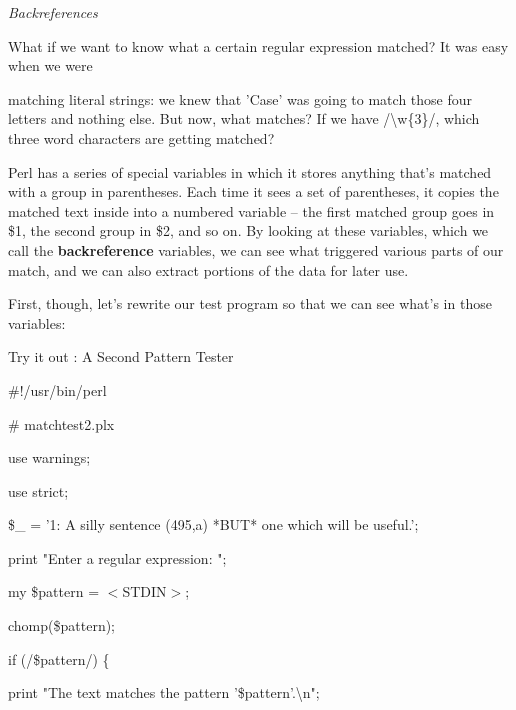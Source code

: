 \documentclass[a4paper,11pt]{book}
\begin{document}
\noindent 

\noindent 

\noindent \textit{Backreferences}

\noindent What if we want to know what a certain regular expression matched? It was easy when we were

\noindent matching literal strings: we knew that 'Case' was going to match those four letters and nothing else. But now, what matches? If we have /\textbackslash w\{3\}/, which three word characters are getting matched?

\noindent 

\noindent Perl has a series of special variables in which it stores anything that's matched with a group in parentheses. Each time it sees a set of parentheses, it copies the matched text inside into a numbered variable -- the first matched group goes in \$1, the second group in \$2, and so on. By looking at these variables, which we call the \textbf{backreference }variables, we can see what triggered various parts of our match, and we can also extract portions of the data for later use.

\noindent 

\noindent First, though, let's rewrite our test program so that we can see what's in those variables:

\noindent 

\noindent Try it out : A Second Pattern Tester

\noindent 

\noindent 

\noindent \#!/usr/bin/perl

\noindent \# matchtest2.plx

\noindent use warnings;

\noindent use strict;

\noindent 

\noindent \$\_  = '1: A silly sentence (495,a) *BUT* one which will be useful.';

\noindent 

\noindent print "Enter a regular expression: ";

\noindent my \$pattern = $<$STDIN$>$;

\noindent chomp(\$pattern);

\noindent 

\noindent 

\noindent if (/\$pattern/) \{

\noindent print "The text matches the pattern '\$pattern'.\textbackslash n";
\end{document}
